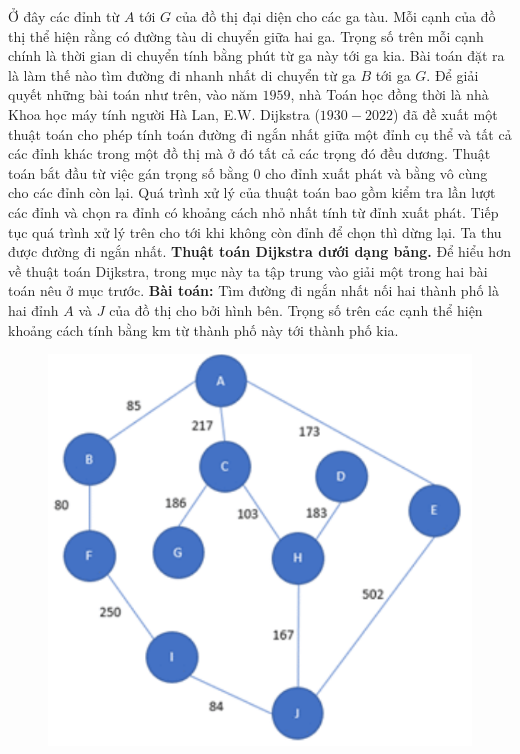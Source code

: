 \begin{multicols}{2}
\begin{figure}[H]
	\end{figure}
	Ở đây các đỉnh từ $A$ tới $G$ của đồ thị đại diện cho các ga tàu. Mỗi cạnh của đồ thị thể hiện rằng có đường tàu di chuyển giữa hai ga. Trọng số trên mỗi cạnh chính là thời gian di chuyển tính bằng phút từ ga này tới ga kia. Bài toán đặt ra là làm thế nào tìm đường đi nhanh nhất di chuyển từ ga $B$ tới ga $G$. 
	\vskip 0.1cm
	Để giải quyết những bài toán như trên, vào năm $1959$, nhà Toán học đồng thời là nhà Khoa học máy tính người Hà Lan, E.W. Dijkstra ($1930 - 2022$) đã đề xuất một thuật toán cho phép tính toán đường đi ngắn nhất giữa một đỉnh cụ thể và tất cả các đỉnh khác trong một đồ thị mà ở đó tất cả các trọng đó đều dương. Thuật toán bắt đầu từ việc gán trọng số bằng $0$ cho đỉnh xuất phát và bằng vô cùng cho các đỉnh còn lại. Quá trình xử lý của thuật toán bao gồm kiểm tra lần lượt các đỉnh và chọn ra đỉnh có khoảng cách nhỏ nhất tính từ đỉnh xuất phát. Tiếp tục quá trình xử lý trên cho tới khi không còn đỉnh để chọn thì dừng lại. Ta thu được đường đi ngắn nhất.
	\vskip 0.1cm
	\textbf{\color{quantoan}Thuật toán Dijkstra dưới dạng bảng.}
	\vskip 0.1cm 
	Để hiểu hơn về thuật toán Dijkstra, trong mục này ta tập trung vào giải một trong hai bài toán nêu ở mục trước.
	\vskip 0.1cm
	\textbf{\color{quantoan}Bài toán:} Tìm đường đi ngắn nhất nối hai thành phố là hai đỉnh $A$ và $J$ của đồ thị cho bởi hình bên. Trọng số trên các cạnh thể hiện khoảng cách tính bằng km từ thành phố này tới thành phố kia. 	
	\begin{figure}[H]
		\vspace*{-5pt}
		\centering
		\captionsetup{labelformat= empty, justification=centering}
		\includegraphics[width= 1\linewidth]{3}

\end{figure}
\end{multicols}
